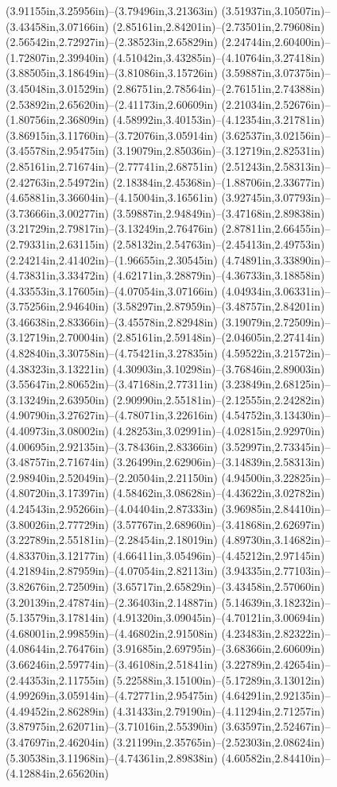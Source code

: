 (3.91155in,3.25956in)--(3.79496in,3.21363in) (3.51937in,3.10507in)--(3.43458in,3.07166in) (2.85161in,2.84201in)--(2.73501in,2.79608in) (2.56542in,2.72927in)--(2.38523in,2.65829in) (2.24744in,2.60400in)--(1.72807in,2.39940in) (4.51042in,3.43285in)--(4.10764in,3.27418in) (3.88505in,3.18649in)--(3.81086in,3.15726in) (3.59887in,3.07375in)--(3.45048in,3.01529in) (2.86751in,2.78564in)--(2.76151in,2.74388in) (2.53892in,2.65620in)--(2.41173in,2.60609in) (2.21034in,2.52676in)--(1.80756in,2.36809in) (4.58992in,3.40153in)--(4.12354in,3.21781in) (3.86915in,3.11760in)--(3.72076in,3.05914in) (3.62537in,3.02156in)--(3.45578in,2.95475in) (3.19079in,2.85036in)--(3.12719in,2.82531in) (2.85161in,2.71674in)--(2.77741in,2.68751in) (2.51243in,2.58313in)--(2.42763in,2.54972in) (2.18384in,2.45368in)--(1.88706in,2.33677in) (4.65881in,3.36604in)--(4.15004in,3.16561in) (3.92745in,3.07793in)--(3.73666in,3.00277in) (3.59887in,2.94849in)--(3.47168in,2.89838in) (3.21729in,2.79817in)--(3.13249in,2.76476in) (2.87811in,2.66455in)--(2.79331in,2.63115in) (2.58132in,2.54763in)--(2.45413in,2.49753in) (2.24214in,2.41402in)--(1.96655in,2.30545in) (4.74891in,3.33890in)--(4.73831in,3.33472in) (4.62171in,3.28879in)--(4.36733in,3.18858in) (4.33553in,3.17605in)--(4.07054in,3.07166in) (4.04934in,3.06331in)--(3.75256in,2.94640in) (3.58297in,2.87959in)--(3.48757in,2.84201in) (3.46638in,2.83366in)--(3.45578in,2.82948in) (3.19079in,2.72509in)--(3.12719in,2.70004in) (2.85161in,2.59148in)--(2.04605in,2.27414in) (4.82840in,3.30758in)--(4.75421in,3.27835in) (4.59522in,3.21572in)--(4.38323in,3.13221in) (4.30903in,3.10298in)--(3.76846in,2.89003in) (3.55647in,2.80652in)--(3.47168in,2.77311in) (3.23849in,2.68125in)--(3.13249in,2.63950in) (2.90990in,2.55181in)--(2.12555in,2.24282in) (4.90790in,3.27627in)--(4.78071in,3.22616in) (4.54752in,3.13430in)--(4.40973in,3.08002in) (4.28253in,3.02991in)--(4.02815in,2.92970in) (4.00695in,2.92135in)--(3.78436in,2.83366in) (3.52997in,2.73345in)--(3.48757in,2.71674in) (3.26499in,2.62906in)--(3.14839in,2.58313in) (2.98940in,2.52049in)--(2.20504in,2.21150in) (4.94500in,3.22825in)--(4.80720in,3.17397in) (4.58462in,3.08628in)--(4.43622in,3.02782in) (4.24543in,2.95266in)--(4.04404in,2.87333in) (3.96985in,2.84410in)--(3.80026in,2.77729in) (3.57767in,2.68960in)--(3.41868in,2.62697in) (3.22789in,2.55181in)--(2.28454in,2.18019in) (4.89730in,3.14682in)--(4.83370in,3.12177in) (4.66411in,3.05496in)--(4.45212in,2.97145in) (4.21894in,2.87959in)--(4.07054in,2.82113in) (3.94335in,2.77103in)--(3.82676in,2.72509in) (3.65717in,2.65829in)--(3.43458in,2.57060in) (3.20139in,2.47874in)--(2.36403in,2.14887in) (5.14639in,3.18232in)--(5.13579in,3.17814in) (4.91320in,3.09045in)--(4.70121in,3.00694in) (4.68001in,2.99859in)--(4.46802in,2.91508in) (4.23483in,2.82322in)--(4.08644in,2.76476in) (3.91685in,2.69795in)--(3.68366in,2.60609in) (3.66246in,2.59774in)--(3.46108in,2.51841in) (3.22789in,2.42654in)--(2.44353in,2.11755in) (5.22588in,3.15100in)--(5.17289in,3.13012in) (4.99269in,3.05914in)--(4.72771in,2.95475in) (4.64291in,2.92135in)--(4.49452in,2.86289in) (4.31433in,2.79190in)--(4.11294in,2.71257in) (3.87975in,2.62071in)--(3.71016in,2.55390in) (3.63597in,2.52467in)--(3.47697in,2.46204in) (3.21199in,2.35765in)--(2.52303in,2.08624in) (5.30538in,3.11968in)--(4.74361in,2.89838in) (4.60582in,2.84410in)--(4.12884in,2.65620in) 